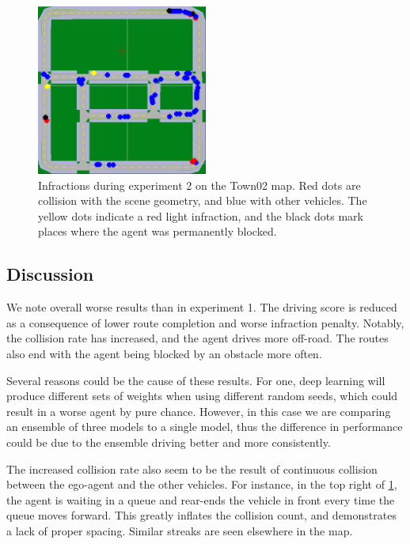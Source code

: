 \begin{figure}
    \centering
    \includegraphics[width=0.5\textwidth]{figures/results/exp2-town02.png}
    \caption{Infractions during experiment 2 on the Town02 map.
    Red dots are collision with the scene geometry,
    and blue with other vehicles.
    The yellow dots indicate a red light infraction,
    and the black dots mark places where the agent was permanently blocked.}
    \label{fig:exp2:town02}
\end{figure}


\subsection{Discussion}

We note overall worse results than in experiment 1.
The driving score is reduced as a consequence of lower route completion and worse infraction penalty.
Notably, the collision rate has increased,
and the agent drives more off-road.
The routes also end with the agent being blocked by an obstacle more often. 

Several reasons could be the cause of these results.
For one, deep learning will produce different sets of weights when using different random seeds,
which could result in a worse agent by pure chance.
However, in this case we are comparing an ensemble of three models to a single model,
thus the difference in performance could be due to the ensemble driving better and more consistently.

The increased collision rate also seem to be the result of continuous collision between the ego-agent and the other vehicles.
For instance, in the top right of \cref{fig:exp2:town02},
the agent is waiting in a queue and rear-ends the vehicle in front
every time the queue moves forward.
This greatly inflates the collision count,
and demonstrates a lack of proper spacing.
Similar streaks are seen elsewhere in the map.

